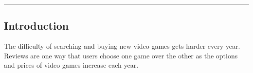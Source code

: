 {\color{gray}\hrule}
\begin{center}
\section*{Introduction}
\end{center}

The difficulty of searching and buying new video games gets harder every year. Reviews are one way that users choose one game over the other as the options and prices of video games increase each year.
